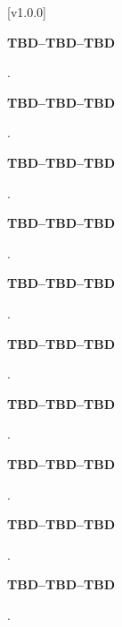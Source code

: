 [v1.0.0]

			\begin{Large}\textbf{TBD--TBD--TBD}\end{Large}.


			\begin{Large}\textbf{TBD--TBD--TBD}\end{Large}.

\secondaryEnd{}

			\begin{Large}\textbf{TBD--TBD--TBD}\end{Large}.

\secondaryEnd{}

			\begin{Large}\textbf{TBD--TBD--TBD}\end{Large}.

\secondaryEnd{}

			\begin{Large}\textbf{TBD--TBD--TBD}\end{Large}.

\secondaryEnd{}

			\begin{Large}\textbf{TBD--TBD--TBD}\end{Large}.

\secondaryEnd{}

			\begin{Large}\textbf{TBD--TBD--TBD}\end{Large}.

\secondaryEnd{}

			\begin{Large}\textbf{TBD--TBD--TBD}\end{Large}.

\secondaryEnd{}

			\begin{Large}\textbf{TBD--TBD--TBD}\end{Large}.

\secondaryEnd{}

			\begin{Large}\textbf{TBD--TBD--TBD}\end{Large}.

\secondaryEnd{}

\primaryEnd{}
